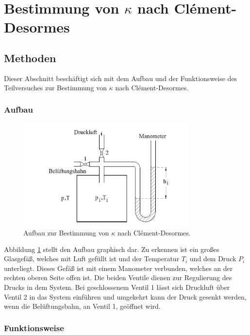 \section{Bestimmung von $\kappa$ nach Clément-Desormes}
	
	\subsection{Methoden}
		
		Dieser Abschnitt beschäftigt sich mit dem Aufbau und der Funktionsweise des Teilversuches zur Bestimmung von $\kappa$ nach Clément-Desormes.
				
		\subsubsection{Aufbau}

			\begin{figure}[ht]
				\centering
				\includegraphics[width=0.8\textwidth]{bilder/aufbau_v2.png}
				\caption{Aufbau zur Bestimmung von $\kappa$ nach Clément-Desormes.\cite{WWU}}
				\label{fig:AufbauV2}	
			\end{figure}
			Abbildung \ref{fig:AufbauV2} stellt den Aufbau graphisch dar.
			Zu erkennen ist ein großes Glasgefäß, welches mit Luft gefüllt ist und der Temperatur $T_i$ und dem Druck $P_i$ unterliegt.
			Dieses Gefäß ist mit einem Manometer verbunden, welches an der rechten oberen Seite offen ist.
			Die beiden Ventile dienen zur Regulierung des Drucks in dem System.
			Bei geschlossenem Ventil 1 lässt sich Druckluft über Ventil 2 in das System einführen und umgekehrt kann der Druck gesenkt werden, wenn die Belüftungsbahn, an Ventil 1, geöffnet wird.
			
		\subsubsection{Funktionsweise}
			
